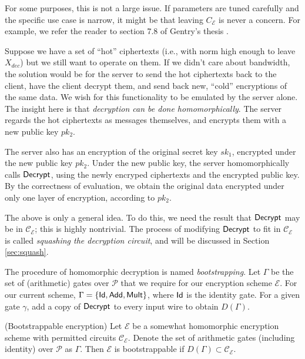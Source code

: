 For some purposes, this is not a large issue. If parameters are tuned carefully and the specific use case is narrow, it might be that leaving $C_{\mathcal{E}}$ is never a concern. For example, we refer the reader to section 7.8 of Gentry's thesis \cite{gentry2009fully}.


Suppose we have a set of ``hot'' ciphertexts (i.e., with norm high enough to leave $X_{dec}$) but we still want to operate on them. If we didn't care about bandwidth, the solution would be for the server to send the hot ciphertexts back to the client, have the client decrypt them, and send back new, ``cold'' encryptions of the same data. We wish for this functionality to be emulated by the server alone. The insight here is that \emph{decryption can be done homomorphically}. The server regards the hot ciphertexts as messages themselves, and encrypts them with a new public key $pk_2$.

The server also has an encryption of the original secret key $sk_1$, encrypted under the new public key $pk_2$. Under the new public key, the server homomorphically calls ${\sf Decrypt}$, using the newly encryped ciphertexts and the encrypted public key. By the correctness of evaluation, we obtain the original data encrypted under only one layer of encryption, according to $pk_2$.

The above is only a general idea. To do this, we need the result that ${\sf Decrypt}$ may be in $\mathcal{C}_{\mathcal{E}}$; this is highly nontrivial. The process of modifying ${\sf Decrypt}$ to fit in $\mathcal{C}_\mathcal{E}$ is called \emph{squashing the decryption circuit}, and will be discussed in Section \ref{sec:squash}.

The procedure of homomorphic decryption is named \emph{bootstrapping}. Let $\Gamma$ be the set of (arithmetic) gates over $\mathcal{P}$ that we require for our encryption scheme $\mathcal{E}$. For our current scheme, $\Gamma = \{{\sf Id}, {\sf Add}, {\sf Mult}\}$, where ${\sf Id}$ is the identity gate. For a given gate $\gamma$, add a copy of ${\sf Decrypt}$ to every input wire to obtain $D(\Gamma)$.
\begin{definition}(Bootstrappable encryption)
Let $\mathcal{E}$ be a somewhat homomorphic encryption scheme with permitted circuits $\mathcal{C}_\mathcal{E}$. Denote the set of arithmetic gates (including identity) over $\mathcal{P}$ as $\Gamma$. Then $\mathcal{E}$ is bootstrappable if $D(\Gamma) \subset \mathcal{C}_\mathcal{E}$.
\end{definition}


